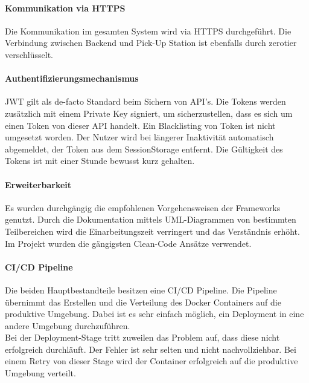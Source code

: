 \paragraph{Kommunikation via HTTPS}
Die Kommunikation im gesamten System wird via \ac{HTTPS} durchgeführt. Die Verbindung zwischen Backend und Pick-Up Station ist ebenfalls durch \gls{zerotier} verschlüsselt. 

\paragraph{Authentifizierungsmechanismus}
\ac{JWT} gilt als de-facto Standard beim Sichern von API's. Die Tokens werden zusätzlich mit einem Private Key signiert, um sicherzustellen, dass es sich um einen Token von dieser API handelt. Ein Blacklisting von Token ist nicht umgesetzt worden. Der Nutzer wird bei längerer Inaktivität automatisch abgemeldet, der Token aus dem \gls{SessionStorage} entfernt. Die Gültigkeit des Tokens ist mit einer Stunde bewusst kurz gehalten. \\

\paragraph{Erweiterbarkeit}
Es wurden durchgängig die empfohlenen Vorgehensweisen der Frameworks genutzt. Durch die Dokumentation mittels \ac{UML}-Diagrammen von bestimmten Teilbereichen wird die Einarbeitungszeit verringert und das Verständnis erhöht. Im Projekt wurden die gängigsten Clean-Code Ansätze verwendet. 

\paragraph{CI/CD Pipeline}
Die beiden Hauptbestandteile besitzen eine CI/CD Pipeline. Die Pipeline übernimmt das Erstellen und die Verteilung des Docker Containers auf die produktive Umgebung. Dabei ist es sehr einfach möglich, ein Deployment in eine andere Umgebung durchzuführen. \\

Bei der Deployment-Stage tritt zuweilen das Problem auf, dass diese nicht erfolgreich durchläuft. Der Fehler ist sehr selten und nicht nachvollziehbar. Bei einem Retry von dieser Stage wird der Container erfolgreich auf die produktive Umgebung verteilt. 

